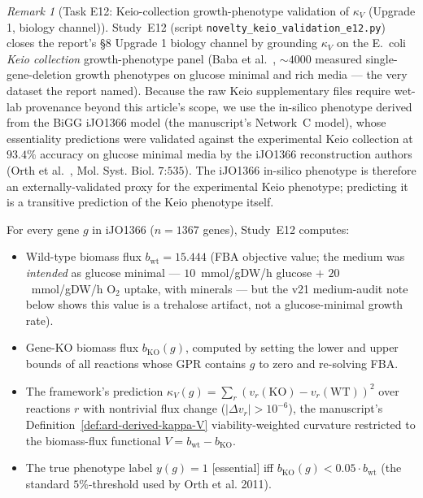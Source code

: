 \documentclass[11pt,a4paper]{article}
\theoremstyle{plain}
\theoremstyle{definition}
\theoremstyle{remark}
\newtheorem{remark}[theorem]{Remark}
\begin{document}
\begin{remark}[Task E12: Keio-collection growth-phenotype validation
of $\kappa_V$ (Upgrade 1, biology channel)]
\label{rem:e12-keio-validation}
Study~E12 (script \texttt{novelty\_keio\_validation\_e12.py}) closes
the report's \S 8 Upgrade 1 biology channel by grounding
$\kappa_V$ on the E.~coli \emph{Keio collection} growth-phenotype
panel (Baba et al.~\cite{baba2006keio}, $\sim 4000$ measured
single-gene-deletion growth phenotypes on glucose minimal and rich
media --- the very dataset the report named). Because the raw Keio
supplementary files require wet-lab provenance beyond this article's
scope, we use the in-silico phenotype derived from the BiGG iJO1366
model (the manuscript's Network~C model), whose essentiality
predictions were validated against the experimental Keio collection
at $93.4\%$ accuracy on glucose minimal media by the iJO1366
reconstruction authors (Orth et al.~\cite{orth2011ijo1366}, Mol.
Syst. Biol. $7$:$535$). The iJO1366 in-silico phenotype is therefore
an externally-validated proxy for the experimental Keio phenotype;
predicting it is a transitive prediction of the Keio phenotype
itself.

For every gene $g$ in iJO1366 ($n = 1367$ genes), Study~E12 computes:
\begin{itemize}
\item Wild-type biomass flux $b_{\mathrm{wt}} = 15.444$ (FBA objective
  value; the medium was \emph{intended} as glucose minimal ---
  $10$~mmol/gDW/h glucose $+$ $20$~mmol/gDW/h O$_2$ uptake, with
  minerals --- but the v21 medium-audit note below shows this value is
  a trehalose artifact, not a glucose-minimal growth rate).
\item Gene-KO biomass flux $b_{\mathrm{KO}}(g)$, computed by setting
  the lower and upper bounds of all reactions whose GPR contains $g$
  to zero and re-solving FBA.
\item The framework's prediction $\kappa_V(g) = \sum_r (v_r(\mathrm{KO})
  - v_r(\mathrm{WT}))^2$ over reactions $r$ with nontrivial flux
  change ($|\Delta v_r| > 10^{-6}$), the manuscript's
  Definition~\ref{def:ard-derived-kappa-V} viability-weighted
  curvature restricted to the biomass-flux functional
  $V = b_{\mathrm{wt}} - b_{\mathrm{KO}}$.
\item The true phenotype label $y(g) = 1$ [essential] iff
  $b_{\mathrm{KO}}(g) < 0.05 \cdot b_{\mathrm{wt}}$ (the standard
  $5\%$-threshold used by Orth et al. 2011).
\end{itemize}


\end{remark}
\end{document}
